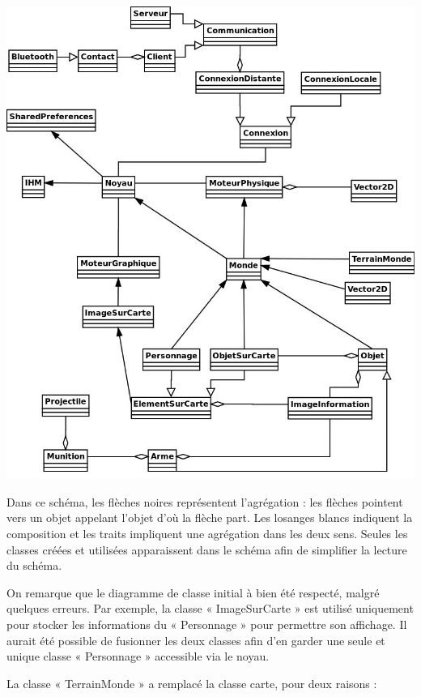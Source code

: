 \documentclass{report}
\begin{document}
\includegraphics[scale=0.5]{images/graph5}

Dans ce schéma, les flèches noires représentent l’agrégation : les flèches pointent vers un objet appelant l’objet d’où la flèche part. Les losanges blancs indiquent la composition et les traits impliquent une agrégation dans les deux sens. Seules les classes créées et utilisées apparaissent dans le schéma afin de simplifier la lecture du schéma.

On remarque que le diagramme de classe initial à bien été respecté, malgré quelques erreurs. Par exemple, la classe « ImageSurCarte » est utilisé uniquement pour stocker les informations du « Personnage » pour permettre son affichage. Il aurait été possible de fusionner les deux classes afin d’en garder une seule et unique classe « Personnage » accessible via le noyau.

La classe « TerrainMonde » a remplacé la classe carte, pour deux raisons :
\end{document}
